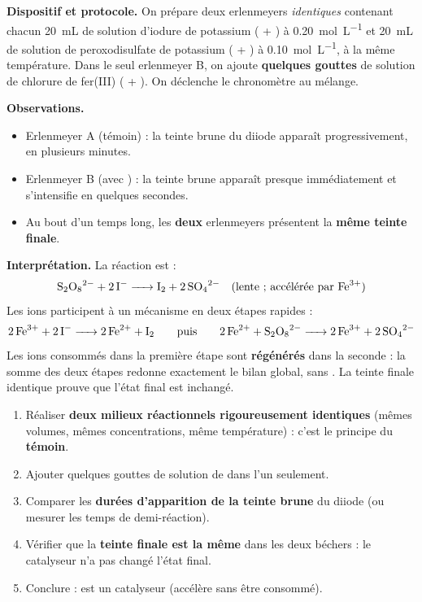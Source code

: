 \documentclass[11pt]{article}
\begin{document}
\begin{experience}
\textbf{Dispositif et protocole.} On prépare deux erlenmeyers \emph{identiques} contenant chacun \SI{20}{mL} de solution d'iodure de potassium ( + ) à \SI{0,20}{\mol\per\liter} et \SI{20}{mL} de solution de peroxodisulfate de potassium ( + ) à \SI{0,10}{\mol\per\liter}, à la même température. Dans le seul erlenmeyer B, on ajoute \textbf{quelques gouttes} de solution de chlorure de fer(III) ( + ). On déclenche le chronomètre au mélange.

\textbf{Observations.}
\begin{itemize}
\item Erlenmeyer A (témoin) : la teinte brune du diiode apparaît progressivement, en plusieurs minutes.
\item Erlenmeyer B (avec ) : la teinte brune apparaît presque immédiatement et s'intensifie en quelques secondes.
\item Au bout d'un temps long, les \textbf{deux} erlenmeyers présentent la \textbf{même teinte finale}.
\end{itemize}

\textbf{Interprétation.} La réaction est :
\[ \ce{S2O8^{2-} + 2 I- -> I2 + 2 SO4^{2-}} \quad \text{(lente ; accélérée par \ce{Fe^{3+}})} \]
Les ions  participent à un mécanisme en deux étapes rapides :
\[ \ce{2 Fe^{3+} + 2 I- -> 2 Fe^{2+} + I2} \qquad \text{puis} \qquad \ce{2 Fe^{2+} + S2O8^{2-} -> 2 Fe^{3+} + 2 SO4^{2-}} \]
Les ions  consommés dans la première étape sont \textbf{régénérés} dans la seconde : la somme des deux étapes redonne exactement le bilan global, sans . La teinte finale identique prouve que l'état final est inchangé.
\end{experience}

\begin{methode}
\begin{enumerate}
\item Réaliser \textbf{deux milieux réactionnels rigoureusement identiques} (mêmes volumes, mêmes concentrations, même température) : c'est le principe du \textbf{témoin}.
\item Ajouter quelques gouttes de solution de  dans l'un seulement.
\item Comparer les \textbf{durées d'apparition de la teinte brune} du diiode (ou mesurer les temps de demi-réaction).
\item Vérifier que la \textbf{teinte finale est la même} dans les deux béchers : le catalyseur n'a pas changé l'état final.
\item Conclure :  est un catalyseur (accélère sans être consommé).
\end{enumerate}
\end{methode}
\end{document}
